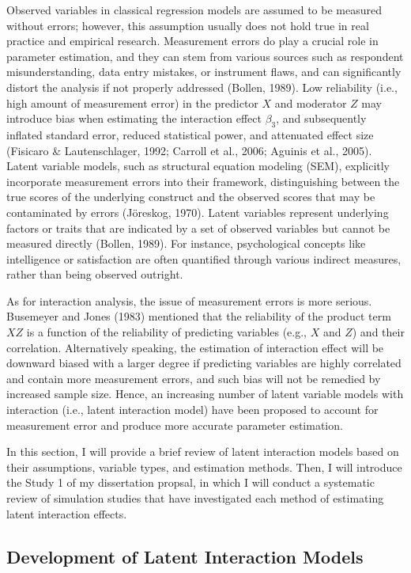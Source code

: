 \documentclass[
  man]{apa7}
\begin{document}
Observed variables in classical regression models are assumed to be measured without errors; however, this assumption usually does not hold true in real practice and empirical research. Measurement errors do play a crucial role in parameter estimation, and they can stem from various sources such as respondent misunderstanding, data entry mistakes, or instrument flaws, and can significantly distort the analysis if not properly addressed (Bollen, 1989). Low reliability (i.e., high amount of measurement error) in the predictor \(X\) and moderator \(Z\) may introduce bias when estimating the interaction effect \(\beta_{3}\), and subsequently inflated standard error, reduced statistical power, and attenuated effect size (Fisicaro \& Lautenschlager, 1992; Carroll et al., 2006; Aguinis et al., 2005). Latent variable models, such as structural equation modeling (SEM), explicitly incorporate measurement errors into their framework, distinguishing between the true scores of the underlying construct and the observed scores that may be contaminated by errors (Jöreskog, 1970). Latent variables represent underlying factors or traits that are indicated by a set of observed variables but cannot be measured directly (Bollen, 1989). For instance, psychological concepts like intelligence or satisfaction are often quantified through various indirect measures, rather than being observed outright.

As for interaction analysis, the issue of measurement errors is more serious. Busemeyer and Jones (1983) mentioned that the reliability of the product term \(XZ\) is a function of the reliability of predicting variables (e.g., \(X\) and \(Z\)) and their correlation. Alternatively speaking, the estimation of interaction effect will be downward biased with a larger degree if predicting variables are highly correlated and contain more measurement errors, and such bias will not be remedied by increased sample size. Hence, an increasing number of latent variable models with interaction (i.e., latent interaction model) have been proposed to account for measurement error and produce more accurate parameter estimation.

In this section, I will provide a brief review of latent interaction models based on their assumptions, variable types, and estimation methods. Then, I will introduce the Study 1 of my dissertation propsal, in which I will conduct a systematic review of simulation studies that have investigated each method of estimating latent interaction effects.

\hypertarget{development-of-latent-interaction-models}{%
\subsection{Development of Latent Interaction Models}\label{development-of-latent-interaction-models}}
\end{document}
